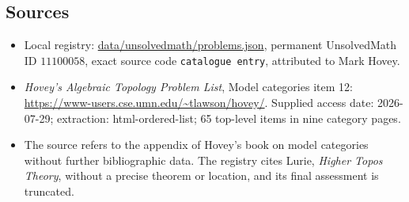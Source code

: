 \documentclass[11pt]{article}
\begin{document}
\subsection{Sources}
\begin{itemize}
\item Local registry: \url{data/unsolvedmath/problems.json}, permanent UnsolvedMath ID $11100058$, exact source code \texttt{catalogue entry}, attributed to Mark Hovey.
\item \emph{Hovey's Algebraic Topology Problem List}, Model categories item 12: \url{https://www-users.cse.umn.edu/~tlawson/hovey/}. Supplied access date: 2026-07-29; extraction: html-ordered-list; 65 top-level items in nine category pages.
\item The source refers to the appendix of Hovey's book on model categories without further bibliographic data. The registry cites Lurie, \emph{Higher Topos Theory}, without a precise theorem or location, and its final assessment is truncated.
\end{itemize}
\end{document}
